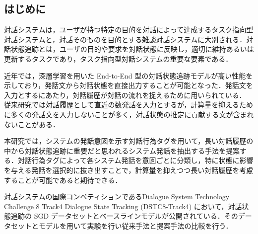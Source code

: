 \documentclass[a4j,twoside]{jarticle}
\begin{document}
\twocolumn[\vspace*{9mm}]     %
\begin{論文概要}              %
  \setcounter{page}{1}          %
  \setlength{\baselineskip}{3.7mm}
  \newcommand{\bm}[1]{\mbox{\boldmath$#1$}}
  \def\argmax{\mathop{\rm argmax}}
  \def\tr{\mathop{\rm tr}}
  \def\sp{~~~~~}
\vspace{-2mm}
\section{はじめに}
対話システムは，ユーザが持つ特定の目的を対話によって達成するタスク指向型対話システムと，対話そのものを目的とする雑談対話システムに大別される．対話状態追跡とは，ユーザの目的や要求を対話状態に反映し，適切に維持あるいは更新するタスクであり，タスク指向型対話システムの重要な要素である．
\par
近年では，深層学習を用いた End-to-End 型の対話状態追跡モデルが高い性能を示しており，発話文から対話状態を直接出力することが可能となった\cite{nbt,e2e}．発話文を入力とするにあたり，対話履歴が対話の流れを捉えるために用いられている．
従来研究では対話履歴として直近の数発話を入力とするが，計算量を抑えるために多くの発話文を入力しないことが多く，対話状態の推定に貢献する文が含まれないことがある．
\par
本研究では，システムの発話意図を示す対話行為タグを用いて，長い対話履歴の中から対話状態追跡に重要だと思われるシステム発話を抽出する手法を提案する．対話行為タグによって各システム発話を意図ごとに分類し，特に状態に影響を与える発話を選択的に抜き出すことで，計算量を抑えつつ長い対話履歴を考慮することが可能であると期待できる．
\par
対話システムの国際コンペティションであるDialogue System Technology Challenge 8 Track4 Dialogue State Tracking (DSTC8-Track4) \cite{dstc8} において，対話状態追跡の  SGD データセットとベースラインモデルが公開されている．そのデータセットとモデルを用いて実験を行い従来手法と提案手法の比較を行う．

\vspace{-2mm}

\end{論文概要}
\end{document}
